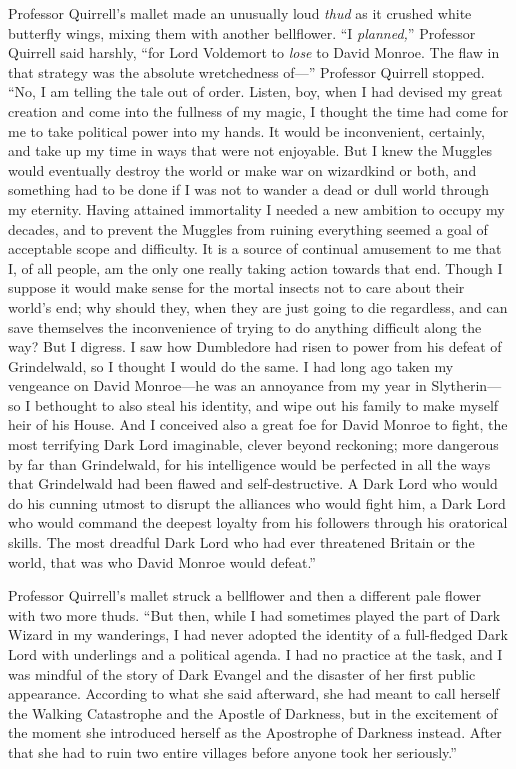 Professor Quirrell’s mallet made an unusually loud \emph{thud} as it crushed
white butterfly wings, mixing them with another bellflower. “I \emph{planned,}”
Professor Quirrell said harshly, “for Lord Voldemort to \emph{lose} to David
Monroe. The flaw in that strategy was the absolute wretchedness of—”
Professor Quirrell stopped. “No, I am telling the tale out of order. Listen,
boy, when I had devised my great creation and come into the fullness of my
magic, I thought the time had come for me to take political power into my
hands. It would be inconvenient, certainly, and take up my time in ways that
were not enjoyable. But I knew the Muggles would eventually destroy the world
or make war on wizardkind or both, and something had to be done if I was not to
wander a dead or dull world through my eternity. Having attained immortality I
needed a new ambition to occupy my decades, and to prevent the Muggles from
ruining everything seemed a goal of acceptable scope and difficulty. It is a
source of continual amusement to me that I, of all people, am the only one
really taking action towards that end. Though I suppose it would make sense for
the mortal insects not to care about their world’s end; why should they, when
they are just going to die regardless, and can save themselves the
inconvenience of trying to do anything difficult along the way? But I digress.
I saw how Dumbledore had risen to power from his defeat of Grindelwald, so I
thought I would do the same. I had long ago taken my vengeance on David
Monroe—he was an annoyance from my year in Slytherin—so I bethought to also
steal his identity, and wipe out his family to make myself heir of his House.
And I conceived also a great foe for David Monroe to fight, the most terrifying
Dark Lord imaginable, clever beyond reckoning; more dangerous by far than
Grindelwald, for his intelligence would be perfected in all the ways that
Grindelwald had been flawed and self-destructive. A Dark Lord who would do his
cunning utmost to disrupt the alliances who would fight him, a Dark Lord who
would command the deepest loyalty from his followers through his oratorical
skills. The most dreadful Dark Lord who had ever threatened Britain or the
world, that was who David Monroe would defeat.”

Professor Quirrell’s mallet struck a bellflower and then a different pale
flower with two more thuds. “But then, while I had sometimes played the part of
Dark Wizard in my wanderings, I had never adopted the identity of a
full-fledged Dark Lord with underlings and a political agenda. I had no
practice at the task, and I was mindful of the story of Dark Evangel and the
disaster of her first public appearance. According to what she said afterward,
she had meant to call herself the Walking Catastrophe and the Apostle of
Darkness, but in the excitement of the moment she introduced herself as the
Apostrophe of Darkness instead. After that she had to ruin two entire villages
before anyone took her seriously.”

